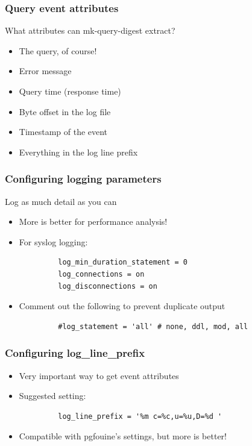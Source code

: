 \begin{frame}
   \frametitle{Query event attributes}
   \begin{block}{What attributes can mk-query-digest extract?}
   \begin{itemize}
      \item The query, of course!
      \item Error message
      \item Query time (response time)
      \item Byte offset in the log file
      \item Timestamp of the event
      \item Everything in the log line prefix
   \end{itemize}
   \end{block}
\end{frame}

\begin{frame}[fragile]
   \frametitle{Configuring logging parameters}
   \begin{block}{Log as much detail as you can}
   \begin{itemize}
      \item More is better for performance analysis!
      \item For syslog logging:
         \begin{verbatim}
         log_min_duration_statement = 0
         log_connections = on
         log_disconnections = on
         \end{verbatim}
      \item Comment out the following to prevent duplicate output
         \begin{verbatim}
         #log_statement = 'all' # none, ddl, mod, all
         \end{verbatim}
   \end{itemize}
   \end{block}
\end{frame}

\begin{frame}[fragile]
   \frametitle{Configuring log\_line\_prefix}
   \begin{itemize}
      \item Very important way to get event attributes
      \item Suggested setting:
         \begin{verbatim}
         log_line_prefix = '%m c=%c,u=%u,D=%d '
         \end{verbatim}
      \item Compatible with pgfouine's settings, but more is better!
   \end{itemize}
\end{frame}

